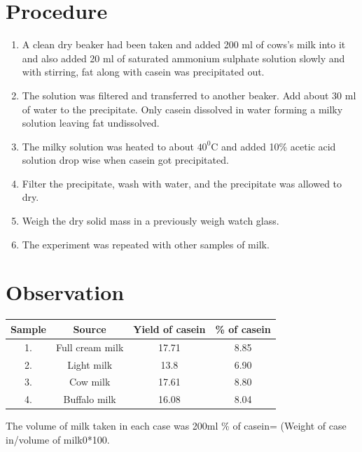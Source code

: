 \documentclass[aps, jcp, prb, two column, showpacs,groupedaddress,]{revtex4-2}
\begin{document}
\section{Procedure}

\begin{enumerate}
\item A clean dry beaker had been taken and added 200 ml of cows's milk into it and also added 20 ml of saturated ammonium sulphate solution slowly and with stirring, fat along with casein was precipitated out. \vspace{-0.1cm}
\item The solution was filtered and transferred to another beaker. Add about 30 ml of water to the precipitate. Only casein dissolved in water forming a milky solution leaving fat undissolved. \vspace{-0.1cm}
\item The milky solution was heated to about $40 ^{0}$C and added 10\% acetic acid solution drop wise when casein got precipitated. \vspace{-0.1cm}
\item Filter the precipitate, wash with water, and the precipitate was allowed to dry. \vspace{-0.1cm}
\item Weigh the dry solid mass in a previously weigh watch glass. \vspace{-0.1cm}
\item The experiment was repeated with other samples of milk. \vspace{-0.1cm}
\end{enumerate}


\section{Observation}

\begin{table}[!h]
\centering
\begin{tabular}{|c|c|c|c|}
\hline
Sample & Source & Yield of casein & \% of casein \\
\hline
1. & Full cream milk & 17.71 & 8.85 \\
\hline
2. & Light milk & 13.8 & 6.90 \\
\hline
3. & Cow milk & 17.61 & 8.80 \\
\hline
4. & Buffalo milk & 16.08 & 8.04 \\
\hline
\end{tabular}
\end{table}
The volume of milk taken in each case was 200ml
\% of casein= (Weight of case in/volume of milk0*100.
\end{document}

